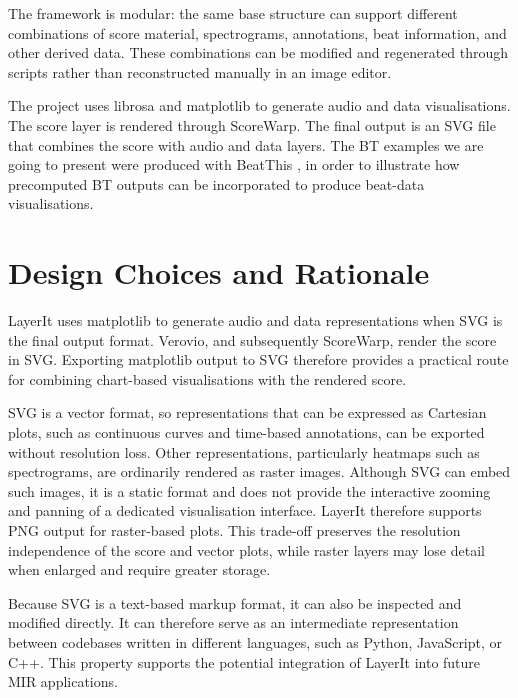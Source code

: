 The framework is modular: the same base structure can support different combinations of score material, spectrograms, annotations, beat information, and other derived data. These combinations can be modified and regenerated through scripts rather than reconstructed manually in an image editor.

The project uses librosa \cite{mcfeeLibrosaLibrosa01102025} and matplotlib \cite{thematplotlibdevelopmentteamMatplotlibVisualizationPython2026} to generate audio and data visualisations. The score layer is rendered through ScoreWarp. The final output is an SVG file that combines the score with audio and data layers. The BT examples we are going to present were produced with BeatThis \cite{foscarinBeatThisAccurate2024a}, in order to illustrate how precomputed BT outputs can be incorporated to produce beat-data visualisations.

\section{Design Choices and Rationale}
LayerIt uses matplotlib to generate audio and data representations when SVG is the final output format. Verovio, and subsequently ScoreWarp, render the score in SVG. Exporting matplotlib output to SVG therefore provides a practical route for combining chart-based visualisations with the rendered score.

SVG is a vector format, so representations that can be expressed as Cartesian plots, such as continuous curves and time-based annotations, can be exported without resolution loss. Other representations, particularly heatmaps such as spectrograms, are ordinarily rendered as raster images. Although SVG can embed such images, it is a static format and does not provide the interactive zooming and panning of a dedicated visualisation interface. LayerIt therefore supports PNG output for raster-based plots. This trade-off preserves the resolution independence of the score and vector plots, while raster layers may lose detail when enlarged and require greater storage.

Because SVG is a text-based markup format, it can also be inspected and modified directly. It can therefore serve as an intermediate representation between codebases written in different languages, such as Python, JavaScript, or C++. This property supports the potential integration of LayerIt into future MIR applications.

